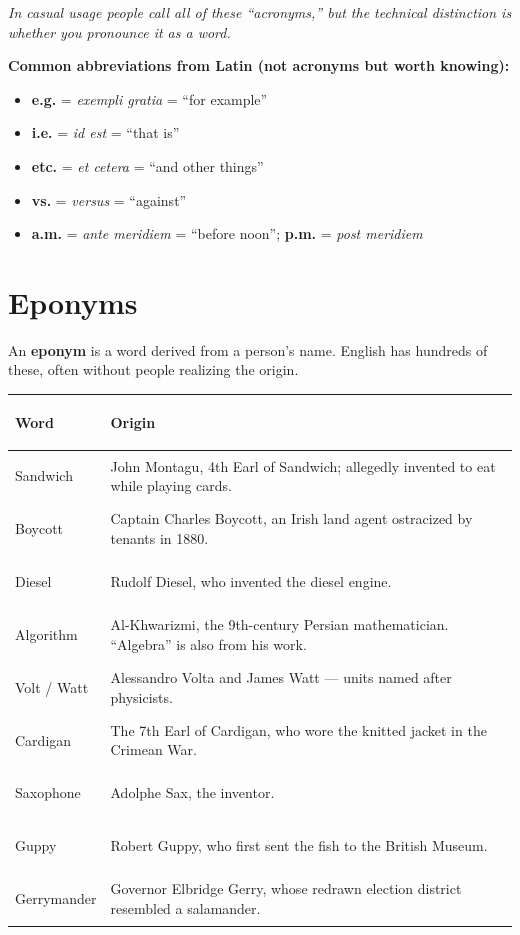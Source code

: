 \documentclass[11pt, letterpaper]{article}
\begin{document}
\textit{In casual usage people call all of these ``acronyms,'' but the technical distinction is whether you pronounce it as a word.}

\textbf{Common abbreviations from Latin (not acronyms but worth knowing):}
\begin{itemize}[noitemsep]
  \item \textbf{e.g.} = \emph{exempli gratia} = ``for example''
  \item \textbf{i.e.} = \emph{id est} = ``that is''
  \item \textbf{etc.} = \emph{et cetera} = ``and other things''
  \item \textbf{vs.} = \emph{versus} = ``against''
  \item \textbf{a.m.} = \emph{ante meridiem} = ``before noon''; \textbf{p.m.} = \emph{post meridiem}
\end{itemize}

\section*{Eponyms}

An \textbf{eponym} is a word derived from a person's name. English has hundreds of these,
often without people realizing the origin.

\noindent
{\renewcommand{\arraystretch}{1.5}
\begin{tabularx}{\textwidth}{>{\bfseries\raggedright\arraybackslash}p{3.5cm}
                              >{\raggedright\arraybackslash}X}
\toprule
\rowcolor{tableheadergreen}
\textbf{Word} & \textbf{Origin} \\
\midrule
\rowcolor{rowA}  Sandwich    & John Montagu, 4th Earl of Sandwich; allegedly invented to eat while playing cards. \\
\rowcolor{rowBg} Boycott     & Captain Charles Boycott, an Irish land agent ostracized by tenants in 1880. \\
\rowcolor{rowA}  Diesel      & Rudolf Diesel, who invented the diesel engine. \\
\rowcolor{rowBg} Algorithm   & Al-Khwarizmi, the 9th-century Persian mathematician. ``Algebra'' is also from his work. \\
\rowcolor{rowA}  Volt / Watt & Alessandro Volta and James Watt --- units named after physicists. \\
\rowcolor{rowBg} Cardigan    & The 7th Earl of Cardigan, who wore the knitted jacket in the Crimean War. \\
\rowcolor{rowA}  Saxophone   & Adolphe Sax, the inventor. \\
\rowcolor{rowBg} Guppy       & Robert Guppy, who first sent the fish to the British Museum. \\
\rowcolor{rowA}  Gerrymander & Governor Elbridge Gerry, whose redrawn election district resembled a salamander. \\
\bottomrule
\end{tabularx}}
\end{document}
